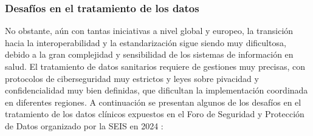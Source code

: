 \subsubsection{Desafíos en el tratamiento de los datos}

No obstante, aún con tantas iniciativas a nivel global y europeo, la transición hacia la interoperabilidad y la estandarización sigue siendo muy dificultosa, debido a la gran complejidad y sensibilidad de los sistemas de información en salud. El tratamiento de datos sanitarios requiere de gestiones muy precisas, con protocolos de ciberseguridad muy estrictos y leyes sobre pivacidad y confidencialidad muy bien definidas, que dificultan la implementación coordinada en diferentes regiones. A continuación se presentan algunos de los desafíos en el tratamiento de los datos clínicos expuestos en el Foro de Seguridad y Protección de Datos organizado por la SEIS en 2024 \cite{SEIS2024tercera} \cite{SEIS2024octava}:

